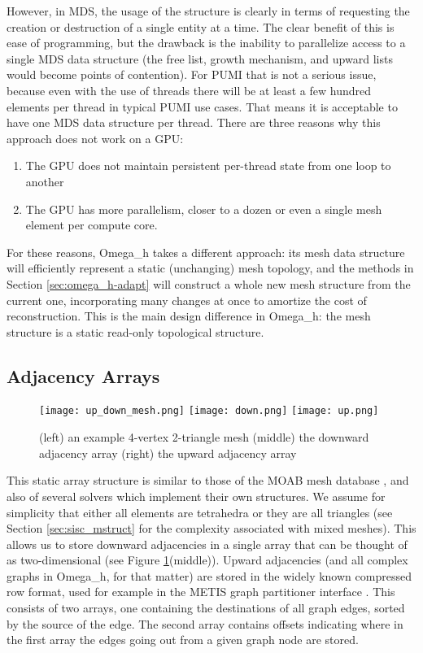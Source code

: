 However, in MDS, the usage of the structure is clearly in terms
of requesting the creation or destruction of a single entity at
a time.
The clear benefit of this is ease of programming, but the drawback
is the inability to parallelize access to a single MDS data structure
(the free list, growth mechanism, and upward lists would become
points of contention).
For PUMI that is not a serious issue, because even with the use of
threads there will be at least a few hundred elements per thread
in typical PUMI use cases.
That means it is acceptable to have one MDS data structure per thread.
There are three reasons why this approach does not work on a GPU:
\begin{enumerate}
\item The GPU does not maintain persistent per-thread state from
one loop to another
\item The GPU has more parallelism, closer to a dozen or even
a single mesh element per compute core.
\end{enumerate}
For these reasons, Omega\_h takes a different approach:
its mesh data structure will efficiently represent a static
(unchanging) mesh topology, and the methods in Section \ref{sec:omega_h-adapt}
will construct a whole new mesh structure from the current
one, incorporating many changes at once to amortize the
cost of reconstruction.
This is the main design difference in Omega\_h: the mesh
structure is a static read-only topological structure.

\subsection{Adjacency Arrays}
\label{sec:adj_arr}

\begin{figure}
\begin{center}
\texttt{[image: up\_down\_mesh.png]}
\texttt{[image: down.png]}
\texttt{[image: up.png]}
\caption{(left) an example 4-vertex 2-triangle mesh
(middle) the downward adjacency array
(right) the upward adjacency array}
\label{fig:osh_up_down}
\end{center}
\end{figure}

This static array structure is similar to those
of the MOAB mesh database \cite{tautges2004moab},
and also of several solvers which implement their own structures.
We assume for simplicity that either all elements are tetrahedra
or they are all triangles (see Section \ref{sec:sisc_mstruct} for
the complexity associated with mixed meshes).
This allows us to store downward adjacencies in a single array
that can be thought of as two-dimensional
(see Figure \ref{fig:osh_up_down}(middle)).
Upward adjacencies (and all complex graphs in Omega\_h, for that matter)
are stored in the widely known compressed row format,
used for example in the METIS graph partitioner interface \cite{METIS}.
This consists of two arrays, one containing the destinations
of all graph edges, sorted by the source of the edge.
The second array contains offsets indicating where in the first
array the edges going out from a given graph node are stored.

